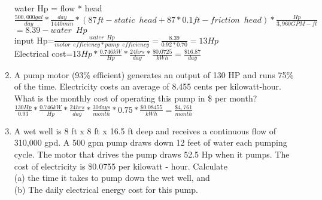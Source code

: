\begin{enumerate}
water Hp = flow * head\\
\vspace{0.4cm}
$\frac{500,000gal}{day}*\frac{day}{1440min}*(87ft-static \enspace head+87*0.1ft-friction \enspace head)*\frac{Hp}{3,960 GPM-ft}$\\
$=8.39 - water \enspace Hp$\\
\vspace{0.4cm}
input Hp=$\frac{water \enspace Hp}{motor \enspace efficiency*pump \enspace efficiency}=\frac{8.39}{0.92*0.70}=\boxed{13Hp}$\\
\vspace{0.4cm}
Electrical cost=$13Hp*\frac{0.746kW}{Hp}*\frac{24hrs}{day}*\frac{\$0.0725}{kWh}=\boxed{\frac{\$16.87}{day}}$

\vspace{0.4cm}


\item A pump motor (93\% efficient) generates an output of 130 HP and runs 75\% of the time. Electricity costs an average of 8.455 cents per kilowatt-hour. What is the monthly cost of operating this pump in \$ per month?\\
\vspace{0.4cm}
$\frac{130Hp}{0.93}*\frac{0.746kW}{Hp}*\frac{24hrs}{day}*\frac{30days}{month}*0.75*\frac{\$0.08455}{kWh}=\boxed{\frac{\$4,761}{month}}$
\pagebreak


\item A wet well is 8 ft x 8 ft x 16.5 ft deep and receives a continuous flow of 310,000 gpd.  A 500 gpm pump draws down 12 feet of water each pumping cycle.  The motor that drives the pump draws 52.5 Hp when it pumps.  The cost of electricity is \$0.0755 per kilowatt - hour.  Calculate\\ 
(a) the time it takes to pump down the wet well, and\\
(b) The daily electrical energy cost for this pump.\\



\end{enumerate}

